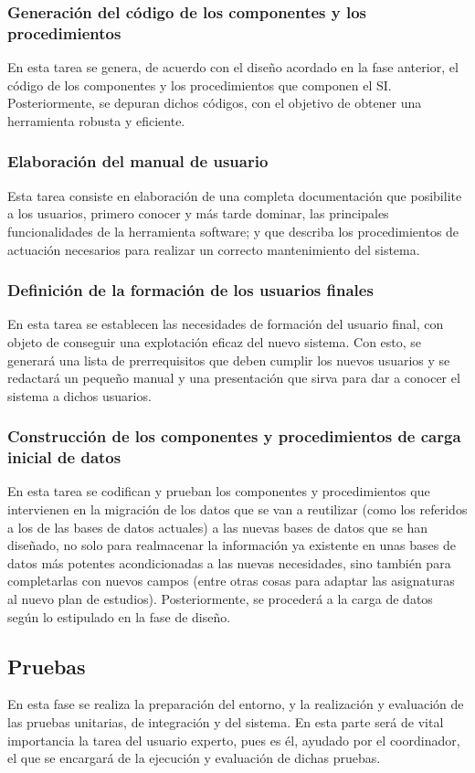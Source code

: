 \documentclass[11pt,a4paper,spanish,twoside]{book}
\begin{document}
\subsubsection{Generación del código de los componentes y los 
procedimientos}
En esta tarea se genera, de acuerdo con el diseño acordado en la fase 
anterior, el código de los componentes y los procedimientos que componen el SI.
Posteriormente, se depuran dichos códigos, con el objetivo de obtener una 
herramienta robusta y eficiente.

\subsubsection{Elaboración del manual de usuario}
Esta tarea consiste en elaboración de una completa documentación que posibilite
a los usuarios, primero conocer y más tarde dominar, las principales
funcionalidades de la herramienta software; y que describa los procedimientos 
de actuación necesarios para realizar un correcto mantenimiento del sistema.

\subsubsection{Definición de la formación de los usuarios finales}
En esta tarea se establecen las necesidades de formación del usuario final, con
objeto de conseguir una explotación eficaz del nuevo sistema. Con esto, se 
generará una lista de prerrequisitos que deben cumplir los nuevos usuarios y 
se redactará un pequeño manual y una presentación que sirva para dar a conocer 
el sistema a dichos usuarios.

\subsubsection{Construcción de los componentes y procedimientos de carga
  inicial de datos}
En esta tarea se codifican y prueban los componentes y procedimientos que 
intervienen en la migración de los datos que se van a reutilizar (como los 
referidos a los de las bases de datos actuales) a las nuevas bases de datos 
que se han diseñado, no solo para realmacenar la información ya existente en
unas bases de datos más potentes acondicionadas a las nuevas necesidades, sino 
también para completarlas con nuevos campos (entre otras cosas para adaptar las
asignaturas al nuevo plan de estudios). Posteriormente, se procederá a la carga 
de datos según lo estipulado en la fase de diseño.

\subsection{Pruebas}
En esta fase se realiza la preparación del entorno, y la realización y 
evaluación de las pruebas unitarias, de integración y del sistema. En esta 
parte será de vital importancia la tarea del usuario experto, pues es él, 
ayudado por el coordinador, el que se encargará de la ejecución y evaluación de
dichas pruebas.
\end{document}
